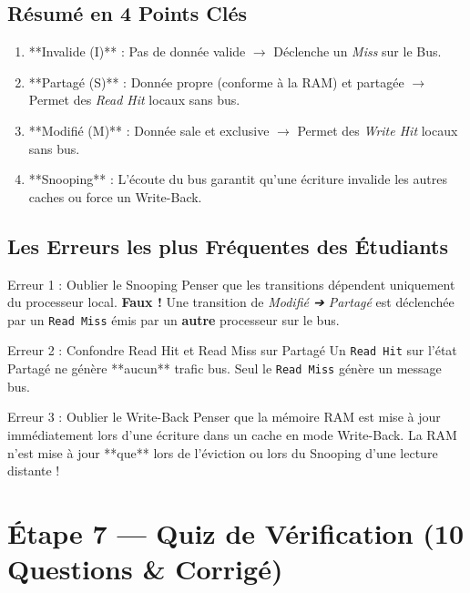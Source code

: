 \documentclass[12pt,a4paper]{article}
\begin{document}
\subsection{Résumé en 4 Points Clés}
\begin{enumerate}
    \item **Invalide (I)** : Pas de donnée valide $\rightarrow$ Déclenche un \textit{Miss} sur le Bus.
    \item **Partagé (S)** : Donnée propre (conforme à la RAM) et partagée $\rightarrow$ Permet des \textit{Read Hit} locaux sans bus.
    \item **Modifié (M)** : Donnée sale et exclusive $\rightarrow$ Permet des \textit{Write Hit} locaux sans bus.
    \item **Snooping** : L'écoute du bus garantit qu'une écriture invalide les autres caches ou force un Write-Back.
\end{enumerate}

\subsection{Les Erreurs les plus Fréquentes des Étudiants}
\begin{alertbox}{Erreur 1 : Oublier le Snooping}
Penser que les transitions dépendent uniquement du processeur local. \textbf{Faux !} Une transition de \textit{Modifié ➔ Partagé} est déclenchée par un \texttt{Read Miss} émis par un \textbf{autre} processeur sur le bus.
\end{alertbox}

\begin{alertbox}{Erreur 2 : Confondre Read Hit et Read Miss sur Partagé}
Un \texttt{Read Hit} sur l'état Partagé ne génère **aucun** trafic bus. Seul le \texttt{Read Miss} génère un message bus.
\end{alertbox}

\begin{alertbox}{Erreur 3 : Oublier le Write-Back}
Penser que la mémoire RAM est mise à jour immédiatement lors d'une écriture dans un cache en mode Write-Back. La RAM n'est mise à jour **que** lors de l'éviction ou lors du Snooping d'une lecture distante !
\end{alertbox}

\newpage
\section{Étape 7 — Quiz de Vérification (10 Questions \& Corrigé)}
\end{document}

